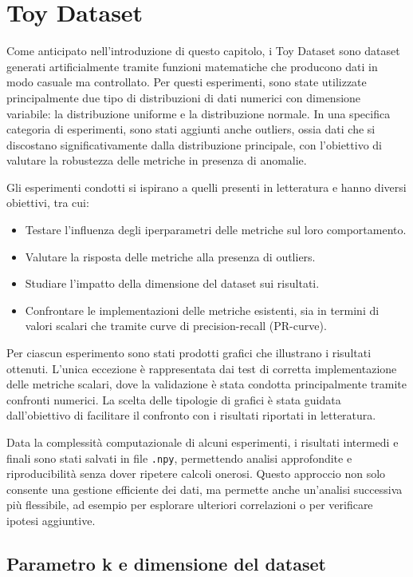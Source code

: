 \section{Toy Dataset}

Come anticipato nell’introduzione di questo capitolo, i Toy Dataset sono dataset generati artificialmente tramite funzioni matematiche che producono dati in modo casuale ma controllato. Per questi esperimenti, sono state utilizzate principalmente due tipo di distribuzioni di dati numerici con dimensione variabile: la distribuzione uniforme e la distribuzione normale. In una specifica categoria di esperimenti, sono stati aggiunti anche outliers, ossia dati che si discostano significativamente dalla distribuzione principale, con l'obiettivo di valutare la robustezza delle metriche in presenza di anomalie.

Gli esperimenti condotti si ispirano a quelli presenti in letteratura e hanno diversi obiettivi, tra cui:
\begin{itemize}
    \item Testare l'influenza degli iperparametri delle metriche sul loro comportamento.
    \item Valutare la risposta delle metriche alla presenza di outliers.
    \item Studiare l'impatto della dimensione del dataset sui risultati.
    \item Confrontare le implementazioni delle metriche esistenti, sia in termini di valori scalari che tramite curve di precision-recall (PR-curve).
\end{itemize}

Per ciascun esperimento sono stati prodotti grafici che illustrano i risultati ottenuti. L'unica eccezione è rappresentata dai test di corretta implementazione delle metriche scalari, dove la validazione è stata condotta principalmente tramite confronti numerici. La scelta delle tipologie di grafici è stata guidata dall'obiettivo di facilitare il confronto con i risultati riportati in letteratura.

Data la complessità computazionale di alcuni esperimenti, i risultati intermedi e finali sono stati salvati in file \texttt{.npy}, permettendo analisi approfondite e riproducibilità senza dover ripetere calcoli onerosi. Questo approccio non solo consente una gestione efficiente dei dati, ma permette anche un'analisi successiva più flessibile, ad esempio per esplorare ulteriori correlazioni o per verificare ipotesi aggiuntive.

\subsection{Parametro k e dimensione del dataset}


